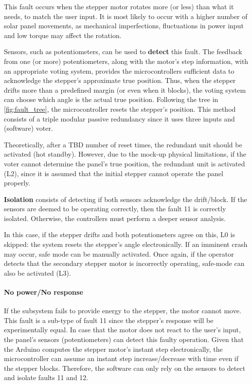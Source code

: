 This fault occurs when the stepper motor rotates more (or less) than what it needs, to match the user input. It is most likely to occur with a higher number of solar panel movements, as mechanical imperfections, fluctuations in power input and low torque may affect the rotation.

Sensors, such as potentiometers, can be used to \textbf{detect} this fault. The feedback from one (or more) potentiometers, along with the motor's step information, with an appropriate voting system, provides the microcontrollers sufficient data to acknowledge the stepper's approximate true position. Thus, when the stepper drifts more than a predefined margin (or even when it blocks), the voting system can choose which angle is the actual true position. Following the tree in \autoref{fig:fault_tree}, the microcontroller resets the stepper's position. This method consists of a triple modular passive redundancy since it uses three inputs and (software) voter.

Theoretically, after a TBD number of reset times, the redundant unit should be activated (hot standby). However, due to the mock-up physical limitations, if the voter cannot determine the panel's true position, the redundant unit is activated (L2), since it is assumed that the initial stepper cannot operate the panel properly.

\textbf{Isolation} consists of detecting if both sensors acknowledge the drift/block. If the sensors are deemed to be operating correctly, then the fault 11 is correctly isolated. Otherwise, the controllers must perform a deeper sensor analysis.

In this case, if the stepper drifts and both potentiometers agree on this, L0 is skipped: the system resets the stepper's angle electronically. If an imminent crash may occur, safe mode can be manually activated. Once again, if the operator detects that the secondary stepper motor is incorrectly operating, safe-mode can also be activated (L3).




\paragraph{No power/No response\\}

If the subsystem fails to provide energy to the stepper, the motor cannot move. This fault is a sub-type of fault 11 since the stepper's response will be experimentally equal. In case that the motor does not react to the user's input, the panel's sensors (potentiometers) can detect this faulty operation. Given that the Arduino computes the stepper motor's instant step electronically, the microcontroller can assume an instant step increase/decrease with time even if the stepper blocks. Therefore, the software can only rely on the sensors to detect and isolate faults 11 and 12.

